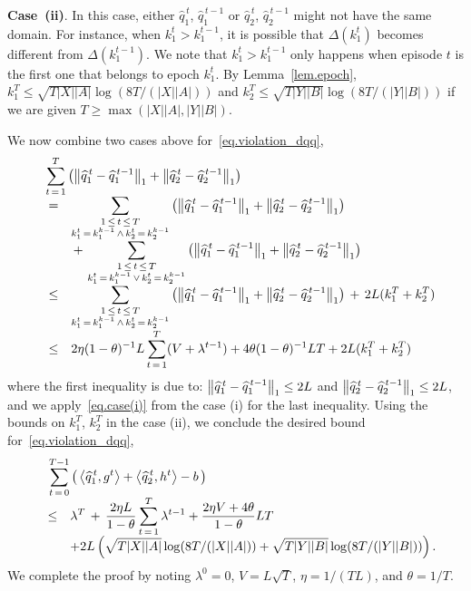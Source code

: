 \documentclass[12pt, final]{l4dc2023}
\begin{document}
\noindent\textbf{Case~(ii)}. In this case, either $\hat q_1^{\,t}$, $\hat q_1^{\,t-1}$ or $ \hat q_2^{\,t}$, $\hat q_2^{\,t-1}$ might not have the same domain. For instance, when $k_1^t>k_1^{t-1}$, it is possible that $\Delta(k_1^{t})$ becomes different from $\Delta(k_1^{t-1})$. We note that $k_1^t>k_1^{t-1}$ only happens when episode $t$ is the first one that belongs to epoch $k_1^t$. By Lemma~\ref{lem.epoch}, $k_1^T \leq \sqrt{ T|X||A|}\log (8T/(|X||A|))$ and  $k_2^T \leq \sqrt{ T|Y||B|}\log (8T/(|Y||B|))$ if we are given $T\geq \max(|X||A|, |Y||B|)$.

We now combine two cases above for~\eqref{eq.violation_dqq},
\[
\begin{array}{rcl}
&& \!\!\!\! \!\!\!\! \!\!\!\!
\displaystyle
\sum_{t\,=\,1}^{T} \rbr{
	\norm{\hat q_1^{\,t} - \hat q_1^{\,t-1}}_1 
	+\norm{\hat q_2^{\,t}-\hat q_2^{\,t-1}}_1}
\\[0.2cm]
&=& \displaystyle
\sum_{\substack{1\,\leq\,t\,\leq\,T\\k_1^t \,=\, k_1^{k-1}\,\wedge\, k_2^t \,=\, k_2^{k-1}}}\rbr{
	\norm{\hat q_1^{\,t} - \hat q_1^{\,t-1}}_1 
	+\norm{\hat q_2^{\,t}-\hat q_2^{\,t-1}}_1}
\\[0.2cm]
&&\displaystyle
\,+\,
\sum_{\substack{1\,\leq\,t\,\leq\,T\\k_1^t \,=\, k_1^{k-1}\,\vee\, k_2^t \,=\, k_2^{k-1}}}\rbr{
	\norm{\hat q_1^{\,t} - \hat q_1^{\,t-1}}_1 
	+\norm{\hat q_2^{\,t}-\hat q_2^{\,t-1}}_1}
\\[0.2cm]
&\leq& \displaystyle
\sum_{\substack{1\,\leq\,t\,\leq\,T\\k_1^t \,=\, k_1^{k-1}\,\wedge\, k_2^t \,=\, k_2^{k-1}}}\rbr{
	\norm{\hat q_1^{\,t} - \hat q_1^{\,t-1}}_1 
	+\norm{\hat q_2^{\,t}-\hat q_2^{\,t-1}}_1}
\,+\,2L (k_1^T+k_2^T)
\\[0.2cm]
&\leq&\displaystyle
2\eta (1-\theta)^{-1} L\sum_{t\,=\,1}^{T} (V+\lambda^{t-1}) + 4 \theta (1-\theta)^{-1}  LT +2L (k_1^T+k_2^T)
\end{array}
\]
where the first inequality is due to: $\left\|{\widehat q_1^{\,t} - \widehat q_1^{\,t-1}}\right\|_1 \leq 2L$ and $\left\|{\widehat q_2^{\,t}-\widehat q_2^{\,t-1}}\right\|_1\leq 2L$, and we apply~\eqref{eq.case(i)} from the case (i) for the last inequality. Using the bounds on $k_1^T$, $k_2^T$ in the case (ii), we conclude the desired bound for~\eqref{eq.violation_dqq},
\[
\begin{array}{rcl}
&& \!\!\!\! \!\!\!\! \!\!
\displaystyle\sum_{t\,=\,0}^{T-1} \big(\inner{\hat q_1^{\,t}}{g^{t}} +\inner{\hat q_2^{\,t}}{h^{t}}-b\, \big)
\\[0.2cm]
&\leq&\displaystyle
\lambda^T
\,+\, 
\frac{2\eta L}{1-\theta}
\sum_{t\,=\,1}^{T} \lambda^{t-1}+ \frac{2\eta V+4 \theta}{1-\theta}  LT 
\\[0.2cm]
&&\displaystyle+2L 
\rbr{\sqrt{ T|X||A|}\log (8T/(|X||A|))+ \sqrt{ T|Y||B|}\log (8T/(|Y||B|))}.
\end{array}
\]
We complete the proof by noting $\lambda^0=0$, $V=L\sqrt{T}$, $\eta = 1/(TL)$, and $\theta = 1/T$. 
\end{document}
